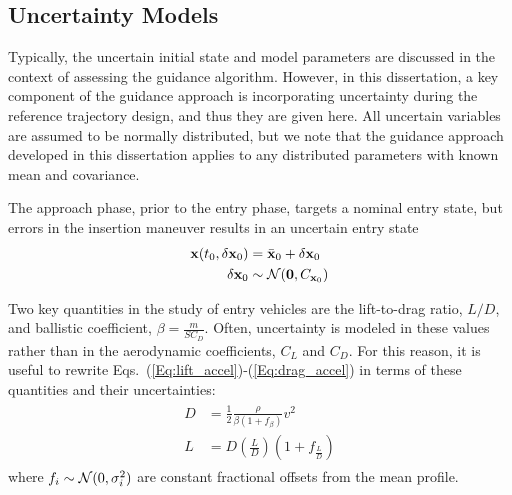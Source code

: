 \subsection{Uncertainty Models}
Typically, the uncertain initial state and model parameters are discussed in the context of assessing the guidance algorithm. However, in this dissertation, a key component of the guidance approach is incorporating uncertainty during the reference trajectory design, and thus they are given here. All uncertain variables are assumed to be normally distributed, but we note that the guidance approach developed in this dissertation applies to any distributed parameters with known mean and covariance. 

The approach phase, prior to the entry phase, targets a nominal entry state, but errors in the insertion maneuver results in an uncertain entry state
\begin{align}
	\mathbf{x}(t_0, \delta\mathbf{x}_0) &= \bar{\mathbf{x}}_0 + \delta\mathbf{x}_0 \\
	\delta\mathbf{x}_0 &\sim \mathcal{N}(\mathbf{0}, C_{\mathbf{x}_0}) \nonumber
\end{align}

Two key quantities in the study of entry vehicles are the lift-to-drag ratio, $L/D$, and ballistic coefficient, $\beta = \frac{m}{SC_D}$. Often, uncertainty is modeled in these values rather than in the aerodynamic coefficients, $C_L$ and $C_D$. For this reason, it is useful to rewrite Eqs.~(\ref{Eq:lift_accel})-(\ref{Eq:drag_accel}) in terms of these quantities and their uncertainties:
\begin{align}
	\begin{split}
		D &= \frac{1}{2}\frac{\rho}{\beta(1 + f_{\beta})} v^2 \\
		L &= D(\frac{L}{D})(1+f_{\frac{L}{D}})  \label{Eq:aero_accels}
	\end{split}
\end{align}
where $f_i\sim\mathcal{N}(0, \sigma^2_i)$ are constant fractional offsets from the mean profile.

